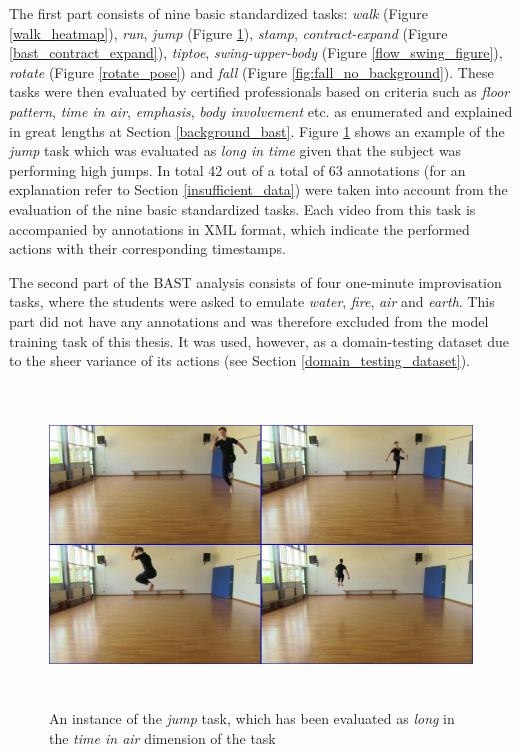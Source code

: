 \documentclass[extern,palatino]{cgMA}
\begin{document}
The first part consists of nine basic standardized tasks: \textit{walk} (Figure \ref{walk_heatmap}), \textit{run}, \textit{jump} (Figure \ref{jump_time_long}), \textit{stamp}, \textit{contract-expand} (Figure \ref{bast_contract_expand}), \textit{tiptoe}, \textit{swing-upper-body} (Figure \ref{flow_swing_figure}), \textit{rotate} (Figure \ref{rotate_pose}) and \textit{fall} (Figure \ref{fig:fall_no_background}). These tasks were then evaluated by certified professionals based on criteria such as \textit{floor pattern}, \textit{time in air}, \textit{emphasis}, \textit{body involvement} etc. as enumerated and explained in great lengths at Section \ref{background_bast}. Figure \ref{jump_time_long} shows an example of the \textit{jump} task which was evaluated as \textit{long in time} given that the subject was performing high jumps. In total 42 out of a total of 63 annotations (for an explanation refer to Section \ref{insufficient_data}) were taken into account from the evaluation of the nine basic standardized tasks. Each video from this task is accompanied by annotations in XML format, which indicate the performed actions with their corresponding timestamps.

\bigskip
\noindent The second part of the BAST analysis consists of four one-minute improvisation tasks, where the students were asked to emulate \textit{water}, \textit{fire}, \textit{air} and \textit{earth}. This part did not have any annotations and was therefore excluded from the model training task of this thesis. It was used, however, as a domain-testing dataset due to the sheer variance of its actions (see Section \ref{domain_testing_dataset}).

\begin{figure}[h]
\center
\includegraphics[height={240pt}, width={400pt}]{Thesis/images/jump_time_long.jpg}
\caption{An instance of the \textit{jump} task, which has been evaluated as \textit{long} in the \textit{time in air} dimension of the task}
\label{jump_time_long}
\end{figure}
\end{document}
